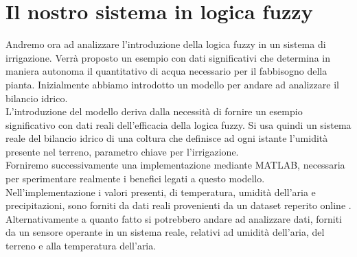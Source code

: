 \documentclass[conference,10pt]{IEEEtran}
\begin{document}
\section{Il nostro sistema in logica fuzzy}\label{sec:symo}
Andremo ora ad analizzare l'introduzione della logica fuzzy in un sistema di irrigazione. Verrà proposto un esempio con dati significativi che determina in maniera autonoma il quantitativo di acqua necessario per il fabbisogno della pianta.
Inizialmente abbiamo introdotto un modello per andare ad analizzare il bilancio idrico.\\
L'introduzione del modello deriva dalla necessità di fornire un esempio significativo con dati reali dell'efficacia della logica fuzzy. Si usa quindi un sistema reale del bilancio idrico di una coltura che definisce ad ogni istante l'umidità presente nel terreno, parametro chiave per l'irrigazione.\\
Forniremo successivamente una implementazione mediante MATLAB, necessaria per sperimentare realmente i benefici legati a questo modello.\\
Nell'implementazione i valori presenti, di temperatura, umidità dell'aria e precipitazioni, sono forniti da dati reali provenienti da un dataset reperito online \cite{7}. \\
Alternativamente a quanto fatto si potrebbero andare ad analizzare dati, forniti da un sensore operante in un sistema reale, relativi ad umidità dell'aria, del terreno e alla temperatura dell'aria.

\end{document}
